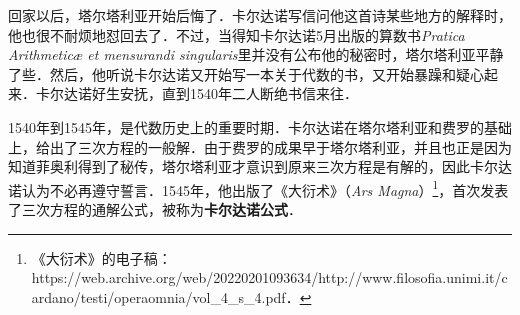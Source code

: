 回家以后，塔尔塔利亚开始后悔了．卡尔达诺写信问他这首诗某些地方的解释时，他也很不耐烦地怼回去了．不过，当得知卡尔达诺5月出版的算数书\textsl{Pratica Arithmeticæ et mensurandi singularis}里并没有公布他的秘密时，塔尔塔利亚平静了些．然后，他听说卡尔达诺又开始写一本关于代数的书，又开始暴躁和疑心起来．卡尔达诺好生安抚，直到1540年二人断绝书信来往．

1540年到1545年，是代数历史上的重要时期．卡尔达诺在塔尔塔利亚和费罗的基础上，给出了三次方程的一般解．由于费罗的成果早于塔尔塔利亚，并且也正是因为知道菲奥利得到了秘传，塔尔塔利亚才意识到原来三次方程是有解的，因此卡尔达诺认为不必再遵守誓言．1545年，他出版了《大衍术》（\textsl{Ars Magna}）\footnote{《大衍术》的电子稿：https://web.archive.org/web/20220201093634/http://www.filosofia.unimi.it/cardano/testi/operaomnia/vol_4_s_4.pdf．}，首次发表了三次方程的通解公式，被称为\textbf{卡尔达诺公式}．





















